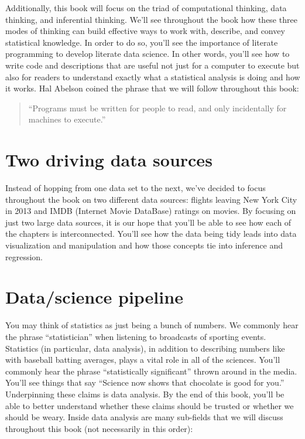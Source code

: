 \documentclass[]{tufte-book}
\begin{document}
Additionally, this book will focus on the triad of computational
thinking, data thinking, and inferential thinking. We'll see throughout
the book how these three modes of thinking can build effective ways to
work with, describe, and convey statistical knowledge. In order to do
so, you'll see the importance of literate programming to develop
literate data science. In other words, you'll see how to write code and
descriptions that are useful not just for a computer to execute but also
for readers to understand exactly what a statistical analysis is doing
and how it works. Hal Abelson coined the phrase that we will follow
throughout this book:

\begin{quote}
``Programs must be written for people to read, and only incidentally for
machines to execute.''
\end{quote}

\section{Two driving data sources}\label{two-driving-data-sources}

Instead of hopping from one data set to the next, we've decided to focus
throughout the book on two different data sources: flights leaving New
York City in 2013 and IMDB (Internet Movie DataBase) ratings on movies.
By focusing on just two large data sources, it is our hope that you'll
be able to see how each of the chapters is interconnected. You'll see
how the data being tidy leads into data visualization and manipulation
and how those concepts tie into inference and regression.

\section{Data/science pipeline}\label{datascience-pipeline}

You may think of statistics as just being a bunch of numbers. We
commonly hear the phrase ``statistician'' when listening to broadcasts
of sporting events. Statistics (in particular, data analysis), in
addition to describing numbers like with baseball batting averages,
plays a vital role in all of the sciences. You'll commonly hear the
phrase ``statistically significant'' thrown around in the media. You'll
see things that say ``Science now shows that chocolate is good for
you.'' Underpinning these claims is data analysis. By the end of this
book, you'll be able to better understand whether these claims should be
trusted or whether we should be weary. Inside data analysis are many
sub-fields that we will discuss throughout this book (not necessarily in
this order):
\end{document}
